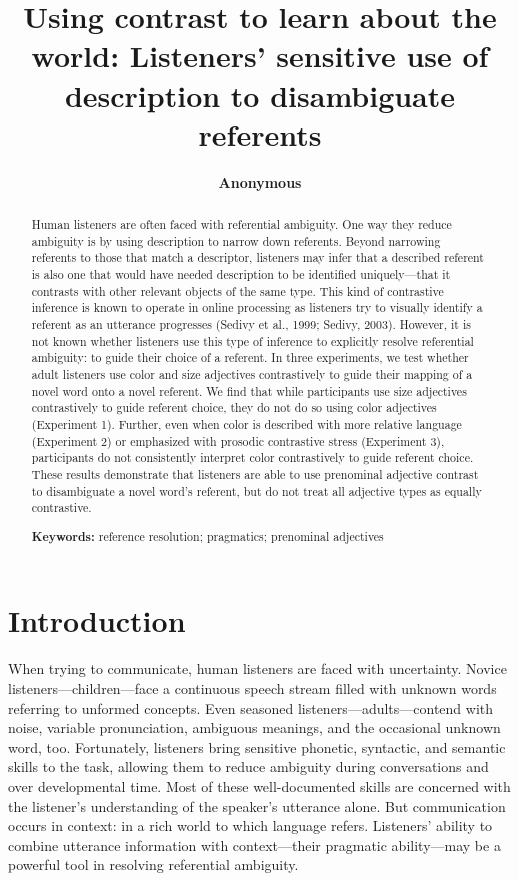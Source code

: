 \documentclass[10pt, letterpaper]{article}
\title{Using contrast to learn about the world: Listeners' sensitive use of
description to disambiguate referents}
\author{{\large \bf Anonymous}}
\begin{document}
\maketitle

\begin{abstract}
Human listeners are often faced with referential ambiguity. One way they
reduce ambiguity is by using description to narrow down referents.
Beyond narrowing referents to those that match a descriptor, listeners
may infer that a described referent is also one that would have needed
description to be identified uniquely---that it contrasts with other
relevant objects of the same type. This kind of contrastive inference is
known to operate in online processing as listeners try to visually
identify a referent as an utterance progresses (Sedivy et al., 1999;
Sedivy, 2003). However, it is not known whether listeners use this type
of inference to explicitly resolve referential ambiguity: to guide their
choice of a referent. In three experiments, we test whether adult
listeners use color and size adjectives contrastively to guide their
mapping of a novel word onto a novel referent. We find that while
participants use size adjectives contrastively to guide referent choice,
they do not do so using color adjectives (Experiment 1). Further, even
when color is described with more relative language (Experiment 2) or
emphasized with prosodic contrastive stress (Experiment 3), participants
do not consistently interpret color contrastively to guide referent
choice. These results demonstrate that listeners are able to use
prenominal adjective contrast to disambiguate a novel word's referent,
but do not treat all adjective types as equally contrastive.

\textbf{Keywords:}
reference resolution; pragmatics; prenominal adjectives
\end{abstract}

\section{Introduction}\label{introduction}

When trying to communicate, human listeners are faced with uncertainty.
Novice listeners---children---face a continuous speech stream filled
with unknown words referring to unformed concepts. Even seasoned
listeners---adults---contend with noise, variable pronunciation,
ambiguous meanings, and the occasional unknown word, too. Fortunately,
listeners bring sensitive phonetic, syntactic, and semantic skills to
the task, allowing them to reduce ambiguity during conversations and
over developmental time. Most of these well-documented skills are
concerned with the listener's understanding of the speaker's utterance
alone. But communication occurs in context: in a rich world to which
language refers. Listeners' ability to combine utterance information
with context---their pragmatic ability---may be a powerful tool in
resolving referential ambiguity.
\end{document}
